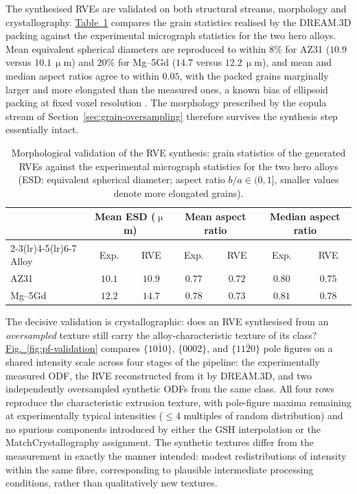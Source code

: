 \documentclass[preprint,12pt]{elsarticle}
\newcommand{\figref}[1]{\hyperref[#1]{Fig.~\ref*{#1}}}
\newcommand{\tabref}[1]{\hyperref[#1]{Table~\ref*{#1}}}
\begin{document}
The synthesised RVEs are validated on both structural streams, morphology and crystallography. \tabref{tab:rve-stats} compares the grain statistics realised by the DREAM.3D packing against the experimental micrograph statistics for the two hero alloys. Mean equivalent spherical diameters are reproduced to within $8\%$ for AZ31 ($10.9$ versus $10.1\,\upmu$m) and $20\%$ for Mg--5Gd ($14.7$ versus $12.2\,\upmu$m), and mean and median aspect ratios agree to within $0.05$, with the packed grains marginally larger and more elongated than the measured ones, a known bias of ellipsoid packing at fixed voxel resolution \cite{groeber2014}. The morphology prescribed by the copula stream of Section~\ref{sec:grain-oversampling} therefore survives the synthesis step essentially intact.

\begin{table}[!t]
\centering
\caption{Morphological validation of the RVE synthesis: grain statistics of the generated RVEs against the experimental micrograph statistics for the two hero alloys (ESD: equivalent spherical diameter; aspect ratio $b/a \in (0,1]$, smaller values denote more elongated grains).}
\label{tab:rve-stats}
\renewcommand{\arraystretch}{1.15}
\begin{tabular}{l cc cc cc}
\toprule
 & \multicolumn{2}{c}{Mean ESD ($\upmu$m)} & \multicolumn{2}{c}{Mean aspect ratio} & \multicolumn{2}{c}{Median aspect ratio} \\
\cmidrule(lr){2-3}\cmidrule(lr){4-5}\cmidrule(lr){6-7}
Alloy & Exp. & RVE & Exp. & RVE & Exp. & RVE \\
\midrule
AZ31    & $10.1$ & $10.9$ & $0.77$ & $0.72$ & $0.80$ & $0.75$ \\
Mg--5Gd & $12.2$ & $14.7$ & $0.78$ & $0.73$ & $0.81$ & $0.78$ \\
\bottomrule
\end{tabular}
\end{table}

The decisive validation is crystallographic: does an RVE synthesised from an \emph{oversampled} texture still carry the alloy-characteristic texture of its class? \figref{fig:pf-validation} compares $\{10\bar{1}0\}$, $\{0002\}$, and $\{11\bar{2}0\}$ pole figures on a shared intensity scale across four stages of the pipeline: the experimentally measured ODF, the RVE reconstructed from it by DREAM.3D, and two independently oversampled synthetic ODFs from the same class. All four rows reproduce the characteristic extrusion texture, with pole-figure maxima remaining at experimentally typical intensities (${\leq}4$ multiples of random distribution) and no spurious components introduced by either the GSH interpolation or the MatchCrystallography assignment. The synthetic textures differ from the measurement in exactly the manner intended: modest redistributions of intensity within the same fibre, corresponding to plausible intermediate processing conditions, rather than qualitatively new textures. %
\end{document}
